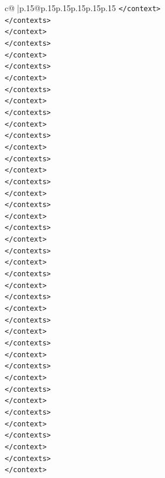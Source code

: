 \documentclass{article}
\begin{document}
{\begin{supertabular}{c@{$\;$}|p{.15\linewidth}@{}p{.15\linewidth}p{.15\linewidth}p{.15\linewidth}p{.15\linewidth}p{.15\linewidth}}
{{{\texttt{</context>} \\
\texttt{</contexts>} \\
\texttt{</context>} \\
\texttt{</contexts>} \\
\texttt{</context>} \\
\texttt{</contexts>} \\
\texttt{</context>} \\
\texttt{</contexts>} \\
\texttt{</context>} \\
\texttt{</contexts>} \\
\texttt{</context>} \\
\texttt{</contexts>} \\
\texttt{</context>} \\
\texttt{</contexts>} \\
\texttt{</context>} \\
\texttt{</contexts>} \\
\texttt{</context>} \\
\texttt{</contexts>} \\
\texttt{</context>} \\
\texttt{</contexts>} \\
\texttt{</context>} \\
\texttt{</contexts>} \\
\texttt{</context>} \\
\texttt{</contexts>} \\
\texttt{</context>} \\
\texttt{</contexts>} \\
\texttt{</context>} \\
\texttt{</contexts>} \\
\texttt{</context>} \\
\texttt{</contexts>} \\
\texttt{</context>} \\
\texttt{</contexts>} \\
\texttt{</context>} \\
\texttt{</contexts>} \\
\texttt{</context>} \\
\texttt{</contexts>} \\
\texttt{</context>} \\
\texttt{</contexts>} \\
\texttt{</context>} \\
\texttt{</contexts>} \\
\texttt{</context>} \\
}}}
\end{supertabular}}
\end{document}
